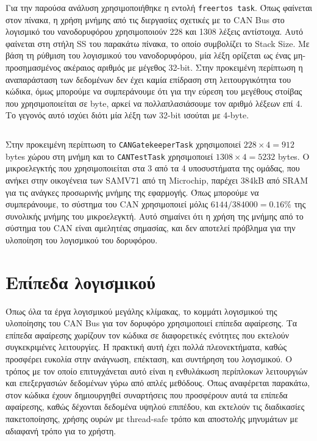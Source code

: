 \documentclass[a4paper,nobib,justified]{tufte-book}
\begin{document}
Για την παρούσα ανάλυση χρησιμοποιήθηκε η εντολή \texttt{freertos task}. Όπως φαίνεται στον πίνακα, η χρήση μνήμης από τις διεργασίες σχετικές με το CAN Bus στο λογισμικό του νανοδορυφόρου χρησιμοποιούν 228 και 1308 λέξεις αντίστοιχα. Αυτό φαίνεται στη στήλη SS του παρακάτω πίνακα, το οποίο συμβολίζει το Stack Size. Με βάση τη ρύθμιση του λογισμικού του νανοδορυφόρου, μία λέξη ορίζεται ως ένας μη-προσημασμένος ακέραιος αριθμός με μέγεθος 32-bit. Στην προκειμένη περίπτωση η αναπαράσταση των δεδομένων δεν έχει καμία επίδραση στη λειτουργικότητα του κώδικα, όμως μπορούμε να συμπεράνουμε ότι για την εύρεση του μεγέθους στοίβας που χρησιμοποιείται σε byte, αρκεί να πολλαπλασιάσουμε τον αριθμό λέξεων επί 4. Το γεγονός αυτό ισχύει διότι μία λέξη των 32-bit ισούται με 4-byte.
\inputminted[breaklines=false,linenos=false]{c++}{code/examples/can-memory-usage.cpp}

Στην προκειμένη περίπτωση το \texttt{CANGatekeeperTask} χρησιμοποιεί $ 228 \times 4 = 912 $ bytes χώρου στη μνήμη και το \texttt{CANTestTask} χρησιμοποιεί $ 1308 \times 4 = 5232 $ bytes. Ο μικροελεγκτής που χρησιμοποιείται στα 3 από τα 4 υποσυστήματα της ομάδας, που ανήκει στην οικογένεια των SAMV71 από τη Microchip, παρέχει 384kB από SRAM για τις ανάγκες προσωρινής μνήμης της εφαρμογής. Όπως μπορούμε να συμπεράνουμε, το σύστημα του CAN χρησιμοποιεί μόλις $ 6144 / 384000 = 0.16\% $ της συνολικής μνήμης του μικροελεγκτή. Αυτό σημαίνει ότι η χρήση της μνήμης από το σύστημα του CAN είναι αμελητέας σημασίας, και δεν αποτελεί πρόβλημα για την υλοποίηση του λογισμικού του δορυφόρου.

\clearpage
\section{Επίπεδα λογισμικού}
Όπως όλα τα έργα λογισμικού μεγάλης κλίμακας, το κομμάτι λογισμικού της υλοποίησης του CAN Bus για τον δορυφόρο χρησιμοποιεί επίπεδα αφαίρεσης. Τα επίπεδα αφαίρεσης χωρίζουν τον κώδικα σε διαφορετικές ενότητες που εκτελούν συγκεκριμένες λειτουργίες. Η πρακτική αυτή έχει πολλά πλεονεκτήματα, καθώς προσφέρει ευκολία στην ανάγνωση, επέκταση, και συντήρηση του λογισμικού. Ο τρόπος με τον οποίο επιτυγχάνεται αυτό είναι η ενθυλάκωση περίπλοκων λειτουργιών και επεξεργασιών δεδομένων γύρω από απλές μεθόδους. Όπως αναφέρεται παρακάτω, στον κώδικα έχουν δημιουργηθεί συναρτήσεις που προσφέρουν αυτά τα επίπεδα αφαίρεσης, καθώς δέχονται δεδομένα υψηλού επιπέδου, και εκτελούν τις διαδικασίες πακετοποίησης, χρήσης ουρών με thread-safe τρόπο και αποστολής μηνυμάτων με αδιαφανή τρόπο για το χρήστη.
\end{document}
